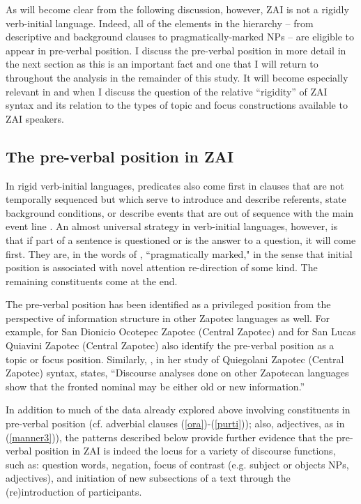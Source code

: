 As will become clear from the following discussion, however, ZAI is not a rigidly verb-initial language. Indeed, all of the elements in the hierarchy -- from descriptive and background clauses to pragmatically-marked NPs -- are eligible to appear in pre-verbal position. I discuss the pre-verbal position in more detail in the next section as this is an important fact and one that I will return to throughout the analysis in the remainder of this study. It will become especially relevant in  and  when I discuss the question of the relative ``rigidity'' of ZAI syntax and its relation to the types of topic and focus constructions available to ZAI speakers. 


\subsection{The pre-verbal position in ZAI}\label{pre-verbalpos}

In rigid verb-initial languages, predicates also come first in clauses that are not temporally sequenced but which serve to introduce and describe referents, state background conditions, or describe events that are out of sequence with the main event line \citep[454]{payne1995}. An almost universal strategy in verb-initial languages, however, is that if part of a sentence is questioned or is the answer to a question, it will come first. They are, in the words of \citet{payne1995}, ``pragmatically marked," in the sense that initial position is associated with novel attention re-direction of some kind. The remaining constituents come at the end. 

The pre-verbal position has been identified as a privileged position from the perspective of information structure in other Zapotec languages as well. For example, \citet{broadwell2002} for San Dionicio Ocotepec Zapotec (Central Zapotec) and \citet{lee2000} for San Lucas Quiavini Zapotec (Central Zapotec) also identify the pre-verbal position as a topic or focus position. Similarly, \citet[103]{black2000}, in her study of Quiegolani Zapotec (Central Zapotec) syntax, states, ``Discourse analyses done on other Zapotecan languages show that the fronted nominal may be either old or new information.'' 

In addition to much of the data already explored above involving constituents in pre-verbal position (cf. adverbial clauses (\ref{ora})-(\ref{purti})); also, adjectives, as in  (\ref{manner3})), the patterns described below provide further evidence that the pre-verbal position in ZAI is indeed the locus for a variety of discourse functions, such as: question words, negation, focus of contrast (e.g. subject or objects NPs, adjectives), and initiation of new subsections of a text through the (re)introduction of participants.

